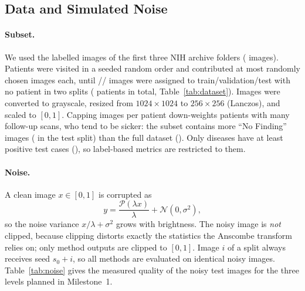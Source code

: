 \documentclass[11pt]{article}
\begin{document}
\subsection{Data and Simulated Noise}
\label{sec:data}
\paragraph{Subset.} We used the labelled images of the first three NIH archive folders (\NAvailable{} images). Patients were visited in a seeded random order and contributed at most \MaxPerPatient{} randomly chosen images each, until \NTrain/\NVal/\NTest{} images were assigned to train/validation/test with no patient in two splits (\NPatients{} patients in total, Table~\ref{tab:dataset}). Images were converted to grayscale, resized from $1024\times1024$ to $256\times256$ (Lanczos), and scaled to $[0,1]$. Capping images per patient down-weights patients with many follow-up scans, who tend to be sicker: the subset contains more ``No Finding'' images (\NoFindTest{} in the test split) than the full dataset (\NoFindFull). Only \NumAUCDiseases{} diseases have at least \MinPos{} positive test cases (\AUCDiseases), so label-based metrics are restricted to them.

\begin{table}[htbp]
\centering
\caption{Dataset split (images, unique patients, share without any finding, and positive cases for the diseases used in $\Delta$AUC).}
\label{tab:dataset}
\resizebox{\linewidth}{!}{}
\end{table}

\paragraph{Noise.} A clean image $x\in[0,1]$ is corrupted as
\begin{equation}
  y = \frac{\mathcal{P}(\lambda x)}{\lambda} + \mathcal{N}(0,\sigma^2),
  \label{eq:noise}
\end{equation}
so the noise variance $x/\lambda + \sigma^2$ grows with brightness. The noisy image is \emph{not} clipped, because clipping distorts exactly the statistics the Anscombe transform relies on; only method outputs are clipped to $[0,1]$. Image $i$ of a split always receives seed $s_0 + i$, so all methods are evaluated on identical noisy images. Table~\ref{tab:noise} gives the measured quality of the noisy test images for the three levels planned in Milestone~1.

\begin{table}[htbp]
\centering
\caption{Measured quality of the noisy test images (\NTest{} images, mean $\pm$ standard deviation). These replace the estimates of Milestone~1 (Section~\ref{sec:challenges}).}
\label{tab:noise}

\end{table}
\end{document}
